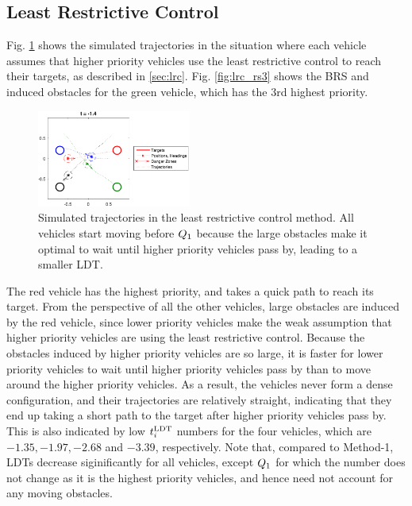 \subsection{Least Restrictive Control}
Fig. \ref{fig:lrc_traj} shows the simulated trajectories in the situation where each vehicle assumes that higher priority vehicles use the least restrictive control to reach their targets, as described in \ref{sec:lrc}. Fig. \ref{fig:lrc_rs3} shows the BRS and induced obstacles for the green vehicle, which has the 3rd highest priority.

\begin{figure}
  \centering
  \includegraphics[width=0.45\textwidth]{"fig/lrc_traj"}
  \caption{Simulated trajectories in the least restrictive control method. All vehicles start moving before $Q_1$ because the large obstacles make it optimal to wait until higher priority vehicles pass by, leading to a smaller LDT. }
  \label{fig:lrc_traj}
\end{figure}

The red vehicle has the highest priority, and takes a quick path to reach its target. From the perspective of all the other vehicles, large obstacles are induced by the red vehicle, since lower priority vehicles make the weak assumption that higher priority vehicles are using the least restrictive control. Because the obstacles induced by higher priority vehicles are so large, it is faster for lower priority vehicles to wait until higher priority vehicles pass by than to move around the higher priority vehicles. As a result, the vehicles never form a dense configuration, and their trajectories are relatively straight, indicating that they end up taking a short path to the target after higher priority vehicles pass by. This is also indicated by low $t^\text{LDT}_i$ numbers for the four vehicles, which are $-1.35, -1.97, -2.68$ and $-3.39$, respectively. Note that, compared to Method-1, LDTs decrease siginificantly for all vehicles, except $Q_1$ for which the number does not change as it is the highest priority vehicles, and hence need not account for any moving obstacles. 

